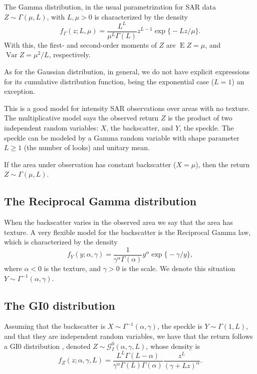 The Gamma distribution, in the usual parametrization for SAR data $Z\sim\Gamma(\mu,L)$, with $L,\mu>0$ is characterized by the density
\begin{equation}
f_\Gamma(z;L,\mu) = \frac{L^L}{\mu^{L}\Gamma(L)} z^{L-1} 
	\exp\big\{ -L z / \mu
	\big\}.
\label{eq:SARGammaDensity}
\end{equation}
With this, the first- and second-order moments of $Z$ are
$\operatorname{E}Z=\mu$,
and 
$\operatorname{Var}Z=\mu^2/L$,
respectively.

As for the Gaussian distribution, in general, we do not have explicit expressions for its cumulative distribution function, being the exponential case ($L=1$) an exception.

This is a good model for intensity SAR observations over areas with no texture.
The multiplicative model says the observed return $Z$ is the product of two independent random variables:
$X$, the backscatter, and
$Y$, the speckle.
The speckle can be modeled by a Gamma random variable with shape parameter $L\geq1$ (the number of looks) and unitary mean.

If the area under observation has constant backscatter ($X=\mu$), then the return $Z\sim\Gamma(\mu,L)$.

\subsection{The Reciprocal Gamma distribution}

When the backscatter varies in the observed area we say that the area has texture.
A very flexible model for the backscatter is the Reciprocal Gamma law\cite{frery96}, which is characterized by the density
\begin{equation}
f_Y(y;\alpha,\gamma)= \frac{1}{\gamma^\alpha \Gamma(\alpha)}
y^\alpha \exp\big\{-\gamma/y\big\},
\label{eq:IGDensity}
\end{equation}
where $\alpha<0$ is the texture, and
$\gamma>0$ is the scale.
We denote this situation $Y\sim \Gamma^{-1}(\alpha,\gamma)$.

\subsection{The GI0 distribution}

Assuming that the backscatter is $X\sim\Gamma^{-1}(\alpha,\gamma)$,
the speckle is $Y\sim\Gamma(1,L)$, and that they are independent random variables, we have that the return follows a GI0 distribution\cite{GeodesicDistanceGI0JSTARS}%
\cite{ParameterEstimationSARStochasticDistancesKernels}, denoted $Z\sim\mathcal G_I^0(\alpha,\gamma,L)$, whose density is
\begin{equation}
f_Z(z;\alpha,\gamma,L) = \frac{L^L \Gamma(L-\alpha)}{\gamma^\alpha \Gamma(L) \Gamma(\alpha)}
\frac{z^L}{(\gamma+Lz)^\alpha}.
\end{equation}

